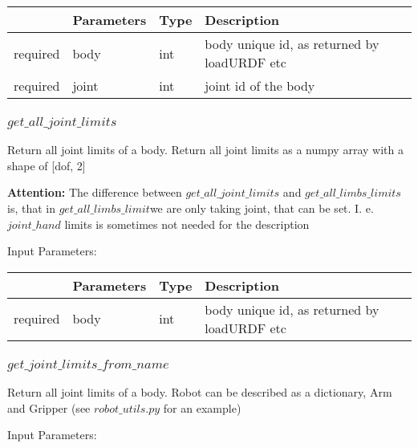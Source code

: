 \documentclass[
	ngerman,
	accentcolor=9c,%
	type=intern,
	marginpar=false
	]{tudapub}
\begin{document}
\begin{tabular}{|p{}|p{}|p{}| p{}|}
\hline
 & \textbf{Parameters} & \textbf{Type} & \textbf{Description} \\
\hline
required & body & int & body unique id, as returned by loadURDF etc\\
\hline
required & joint & int & joint id of the body\\
\hline
\end{tabular}
\vspace{0.5cm}



\subsubsection{$get\_all\_joint\_limits$}
\noindent Return all joint limits of a body. Return all joint limits as a numpy array with a shape of [dof, 2]


\vspace{0.2cm}
\noindent \textbf{Attention: }The difference between $get\_all\_joint\_limits$ and $get\_all\_limbs\_limits$ is, that in
    $get\_all\_limbs\_limit $we are only taking joint, that can be set. I. e. $joint\_hand$ limits is sometimes not needed
    for the description


\vspace{0.5cm}
\noindent Input Parameters:
\vspace{0.5cm}

\begin{tabular}{|p{}|p{}|p{}| p{}|}
\hline
 & \textbf{Parameters} & \textbf{Type} & \textbf{Description} \\
\hline
required & body & int & body unique id, as returned by loadURDF etc\\
\hline
\end{tabular}
\vspace{0.5cm}



\subsubsection{$get\_joint\_limits\_from\_name$}
\noindent Return all joint limits of a body.  Robot can be described as a dictionary, Arm and Gripper (see $robot\_utils.py$ for an example)



\vspace{0.5cm}
\noindent Input Parameters:
\vspace{0.5cm}
\end{document}
